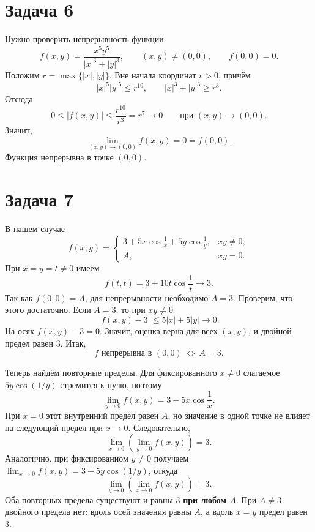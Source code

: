 \documentclass[12pt,a4paper]{article}
\newcommand{\task}[1]{\section*{Задача #1}}
\begin{document}
\newpage
\task{6}
Нужно проверить непрерывность функции
\[
f(x,y)=\frac{x^5y^5}{|x|^3+|y|^3},\qquad (x,y)\neq(0,0),
\qquad f(0,0)=0.
\]
Положим $r=\max\{|x|,|y|\}$. Вне начала координат $r>0$, причём
\[
|x|^5|y|^5\leqslant r^{10},\qquad |x|^3+|y|^3\geqslant r^3.
\]
Отсюда
\[
0\leqslant|f(x,y)|\leqslant\frac{r^{10}}{r^3}=r^7
\longrightarrow0\qquad\text{при }(x,y)\to(0,0).
\]
Значит,
\[
\boxed{\lim_{(x,y)\to(0,0)}f(x,y)=0=f(0,0).}
\]
Функция непрерывна в точке $(0,0)$.

\task{7}
В нашем случае
\[
f(x,y)=
\begin{cases}
3+5x\cos\frac1x+5y\cos\frac1y,&xy\neq0,\\[3pt]
A,&xy=0.
\end{cases}
\]
При $x=y=t\neq0$ имеем
\[
f(t,t)=3+10t\cos\frac1t\longrightarrow3.
\]
Так как $f(0,0)=A$, для непрерывности необходимо $A=3$.
Проверим, что этого достаточно. Если $A=3$, то при $xy\neq0$
\[
|f(x,y)-3|\leqslant5|x|+5|y|\longrightarrow0.
\]
На осях $f(x,y)-3=0$. Значит, оценка верна для всех $(x,y)$,
и двойной предел равен $3$. Итак,
\[
\boxed{f\text{ непрерывна в }(0,0)\ \Longleftrightarrow\ A=3.}
\]

Теперь найдём повторные пределы. Для фиксированного $x\neq0$
слагаемое $5y\cos(1/y)$ стремится к нулю, поэтому
\[
\lim_{y\to0}f(x,y)=3+5x\cos\frac1x.
\]
При $x=0$ этот внутренний предел равен $A$, но значение в одной
точке не влияет на следующий предел при $x\to0$. Следовательно,
\[
\boxed{\lim_{x\to0}\left(\lim_{y\to0}f(x,y)\right)=3.}
\]
Аналогично, при фиксированном $y\neq0$ получаем
$\lim_{x\to0}f(x,y)=3+5y\cos(1/y)$, откуда
\[
\boxed{\lim_{y\to0}\left(\lim_{x\to0}f(x,y)\right)=3.}
\]
Оба повторных предела существуют и равны $3$ \textbf{при любом $A$}.
При $A\neq3$ двойного предела нет: вдоль осей значения равны $A$,
а вдоль $x=y$ предел равен $3$.
\end{document}

